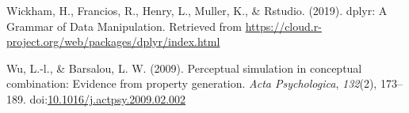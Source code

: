 \documentclass[man]{apa6}
\begin{document}
\leavevmode\hypertarget{ref-Wickham2019}{}%
Wickham, H., Francios, R., Henry, L., Muller, K., \& Rstudio. (2019). dplyr: A Grammar of Data Manipulation. Retrieved from \url{https://cloud.r-project.org/web/packages/dplyr/index.html}

\leavevmode\hypertarget{ref-Wu2009}{}%
Wu, L.-l., \& Barsalou, L. W. (2009). Perceptual simulation in conceptual combination: Evidence from property generation. \emph{Acta Psychologica}, \emph{132}(2), 173--189. doi:\href{https://doi.org/10.1016/j.actpsy.2009.02.002}{10.1016/j.actpsy.2009.02.002}

\endgroup
\end{document}
